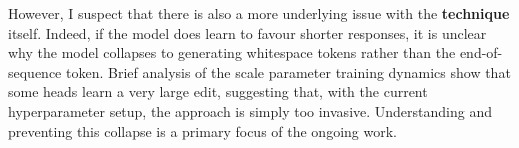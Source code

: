 \documentclass[a4paper,11pt]{article}
\begin{document}
However, I suspect that there is also a more underlying issue with the \textbf{technique} itself. Indeed, if the model does learn to favour shorter responses, it is unclear why the model collapses to generating whitespace tokens rather than the end-of-sequence token. Brief analysis of the scale parameter training dynamics show that some heads learn a very large edit, suggesting that, with the current hyperparameter setup, the approach is simply too invasive. Understanding and preventing this collapse is a primary focus of the ongoing work.
\end{document}

